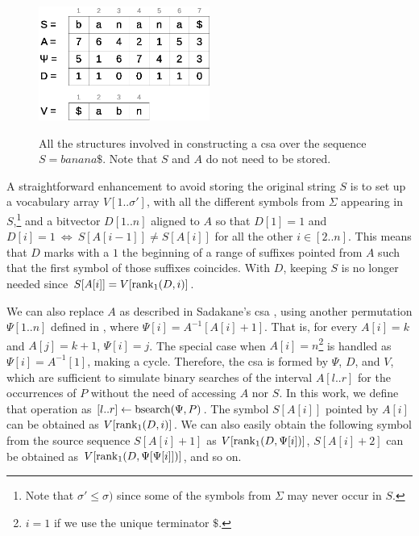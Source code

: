 \documentclass[a4paper,10pt,twoside]{book}
\begin{document}
    \begin{figure}[ht]
		\begin{center}
			{\includegraphics[width=0.5\textwidth]{figures/csa.eps}}
		\end{center}
		\caption{All the structures involved in constructing a \acrlong{csa} over the sequence $S = banana\$$. Note that $S$ and $A$ do not need to be stored.}
		\label{fig:csa}
	\end{figure}
    
    A straightforward enhancement to avoid storing the original string $S$ is to set up a vocabulary array $V[1..\sigma']$, with all the different symbols from $\Sigma$ appearing in $S$,\footnote{Note that $\sigma' \leq \sigma)$ since some of the symbols from $\Sigma$ may never occur in $S$.} and a bitvector $D[1..n]$ aligned to $A$ so that $D[1]=1$ and $D[i]=1~\iff~S[A[i-1]] \neq S[A[i]]$ for all the other $i \in [2..n]$. This means that $D$ marks with a $1$ the beginning of a range of suffixes pointed from $A$ such that the first symbol of those suffixes coincides. With $D$, keeping $S$ is no longer needed since $S[A[i]] = V[\operatorname{rank}_1(D,i)]$.
    
    We can also replace $A$ as described in Sadakane's \acrfull{csa} \cite{Sad03}, using
    another permutation $\Psi[1..n]$ defined in \cite{GV00}, where $\Psi[i] = A^{-1}[A[i]+1]$. That is, for every $A[i]=k$ and $A[j]=k+1$, $\Psi[i]=j$.
    The special case when $A[i]=n$\footnote{$i=1$ if we use the unique terminator $\$$.} is handled as $\Psi[i]=A^{-1}[1]$, making a cycle.
    Therefore, the \gls{csa} is formed by $\Psi$, $D$, and $V$, which are sufficient to simulate binary searches of the interval $A[l..r]$ for the occurrences of $P$ without the need of accessing $A$ nor $S$. In this work, we define that operation as $[l..r]\leftarrow\operatorname{bsearch}(\Psi,P)$.
    The symbol $S[A[i]]$ pointed by $A[i]$ can be obtained as
    $V[\operatorname{rank}_1(D,i)]$. We can also easily obtain the following symbol from the source sequence  $S[A[i]+1]$ as
    $V[\operatorname{rank}_1(D, \Psi[i])]$, $S[A[i]+2]$ can be obtained as $V[\operatorname{rank}_1(D, \Psi[\Psi[i]])]$, and so on.
    
\end{document}
